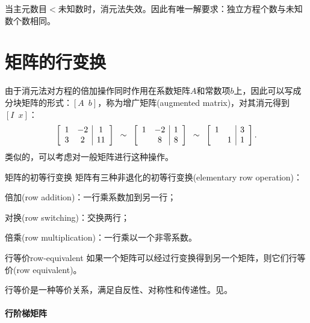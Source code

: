 \begin{remark}
	当主元数目$<$未知数时，消元法失效。因此有唯一解要求：独立方程个数与未知数个数相同。
\end{remark}

\section{矩阵的行变换}

由于消元法对方程的倍加操作同时作用在系数矩阵$A$和常数项$b$上，因此可以写成分块矩阵的形式：$[A\enspace b]$，称为增广矩阵(augmented matrix)，对其消元得到$[I\enspace x]$：
\[
	\left[\begin{array}{cc|c}
		1&-2&1\\3&2&11
	\end{array}\right]
	\enspace\sim\enspace
	\left[\begin{array}{cc|c}
		1&-2&1\\ &8&8
	\end{array}\right]
	\enspace\sim\enspace
	\left[\begin{array}{cc|c}
		1&&3\\ &1&1
	\end{array}\right].
\]
类似的，可以考虑对一般矩阵进行这种操作。

\begin{definition}{矩阵的初等行变换}{}
	矩阵有三种非退化的初等行变换(elementary row operation)：
	\begin{compactitem}
		\item 倍加(row addition)：一行乘系数加到另一行；
		\item 对换(row switching)：交换两行；
		\item 倍乘(row multiplication)：一行乘以一个非零系数。
	\end{compactitem}
\end{definition}

\begin{definition}{行等价}{row-equivalent}
	如果一个矩阵可以经过行变换得到另一个矩阵，则它们行等价(row equivalent)。
\end{definition}

\begin{remark}
	行等价是一种等价关系，满足自反性、对称性和传递性。见。
\end{remark}

\paragraph{行阶梯矩阵}

